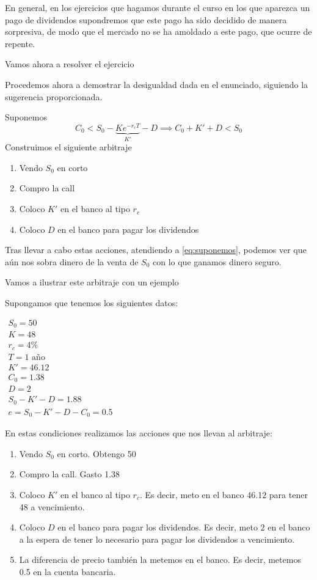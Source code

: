 \begin{problem}[5]
En general, en los ejercicios que hagamos durante el curso en los que aparezca un pago de dividendos supondremos que este pago ha sido decidido de manera sorpresiva, de modo que el mercado no se ha amoldado a este pago, que ocurre de repente.

Vamos ahora a resolver el ejercicio

\spart

Procedemos ahora a demostrar la desigualdad dada en el enunciado, siguiendo la sugerencia proporcionada.

Suponemos
\begin{equation}\label{eq:suponemos}
C_0 < S_0-\underbrace{Ke^{-r_cT}}_{K'}-D \implies C_0+K'+D < S_0
\end{equation}
Construimos el siguiente arbitraje
\begin{enumerate}
\item Vendo $S_0$ en corto
\item Compro la call
\item Coloco $K'$ en el banco al tipo $r_c$
\item Coloco $D$ en el banco para pagar los dividendos
\end{enumerate}
Tras llevar a cabo estas acciones, atendiendo a \ref{eq:suponemos}, podemos ver que aún nos sobra dinero de la venta de $S_0$ con lo que ganamos dinero seguro.

Vamos a ilustrar este arbitraje con un ejemplo

\begin{example}
Supongamos que tenemos los siguientes datos:

\(\begin{array}{l}
S_0 = 50\\
K=48 \\
r_c = 4\% \\
T = 1 \text{ año} \\
K' = 46.12 \\
C_0 =1.38\\
D = 2 \\
S_0-K'-D = 1.88 \\
e = S_0 - K'-D-C_0 = 0.5
\end{array}\)

En estas condiciones realizamos las acciones que nos llevan al arbitraje:
\begin{enumerate}
\item Vendo $S_0$ en corto. Obtengo 50
\item Compro la call. Gasto 1.38
\item Coloco $K'$ en el banco al tipo $r_c$. Es decir, meto en el banco 46.12 para tener 48 a vencimiento.
\item Coloco $D$ en el banco para pagar los dividendos. Es decir, meto $2$ en el banco a la espera de tener lo necesario para pagar los dividendos a vencimiento.
\item La diferencia de precio también la metemos en el banco. Es decir, metemos 0.5 en la cuenta bancaria.
\end{enumerate}


\end{example}
\end{problem}
